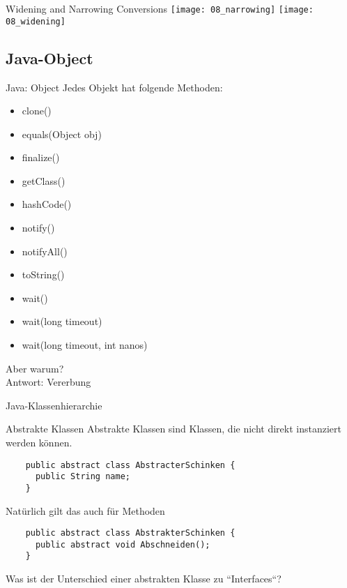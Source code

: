 \documentclass[18pt]{beamer}
\begin{document}
\begin{frame}{Widening and Narrowing Conversions}
 \texttt{[image: 08\_narrowing]}
 \texttt{[image: 08\_widening]}
\end{frame}

\subsection{Java-Object}
\begin{frame}{Java: Object}
  \small
 Jedes Objekt hat folgende Methoden:
 \begin{itemize}
  \item clone()
  \item equals(Object obj)
  \item finalize()
  \item getClass()
  \item hashCode()
  \item notify()
  \item notifyAll()
  \item toString()
  \item wait()
  \item wait(long timeout)
  \item wait(long timeout, int nanos)
 \end{itemize} \pause
 Aber warum? \pause \\
 \large Antwort: Vererbung
 

\end{frame}
\begin{frame}{Java-Klassenhierarchie}
 
\end{frame}

\begin{frame}[fragile]{Abstrakte Klassen}
 Abstrakte Klassen sind Klassen, die nicht direkt instanziert werden können.
 \begin{lstlisting}
    public abstract class AbstracterSchinken {
      public String name;
    }
 \end{lstlisting} \pause
 Natürlich gilt das auch für Methoden
 \begin{lstlisting}
    public abstract class AbstrakterSchinken {
      public abstract void Abschneiden();
    }
 \end{lstlisting} \pause
Was ist der Unterschied einer abstrakten Klasse zu ``Interfaces``?
\end{frame}
\end{document}
